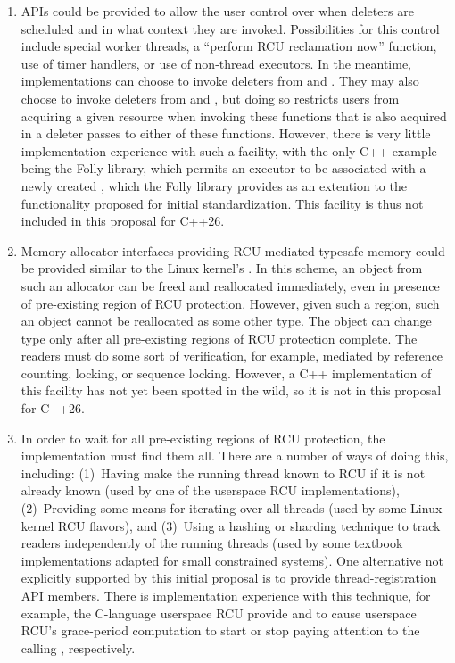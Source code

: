\begin{enumerate}
\item	APIs could be provided to allow the user control over when
	deleters are scheduled and in what context they are invoked.
	Possibilities for this control include special worker threads,
	a ``perform RCU reclamation now'' function, use of timer handlers,
	or use of non-thread executors.
	In the meantime, implementations can choose to invoke deleters
	from  and .
	They may also choose to invoke deleters from 
	and , but doing so restricts users from
	acquiring a given resource when invoking these functions that
	is also acquired in a deleter passes to either of these functions.
	However, there is very little implementation experience with
	such a facility, with the only C++ example being the Folly
	library, which permits an executor to be associated with a
	newly created , which the Folly library provides
	as an extention to the functionality proposed for initial
	standardization.
	This facility is thus not included in this proposal for C++26.
\item	Memory-allocator interfaces providing RCU-mediated typesafe
	memory could be provided similar to the Linux kernel's
	.
	In this scheme, an object from such an allocator can be freed
	and reallocated immediately, even in presence of pre-existing
	region of RCU protection.
	However, given such a region, such an object cannot be reallocated
	as some other type.
	The object can change type only after all pre-existing regions
	of RCU protection complete.
	The readers must do some sort of verification, for example,
	mediated by reference counting, locking, or sequence locking.
	However, a C++ implementation of this facility has not yet been
	spotted in the wild, so it is not in this proposal for C++26.
\item	In order to wait for all pre-existing regions of RCU protection,
	the implementation must find them all.
	There are a number of ways of doing this, including:
	(1)~Having  make the running thread known
	to RCU if it is not already known (used by one of the userspace
	RCU implementations),
	(2)~Providing some means for iterating over all threads (used
	by some Linux-kernel RCU flavors), and
	(3)~Using a hashing or sharding technique to track readers
	independently of the running threads (used by some textbook
	implementations adapted for small constrained systems).
	One alternative not explicitly supported by this initial
	proposal is to provide thread-registration API members.
	There is implementation experience with this technique,
	for example, the C-language userspace RCU provide
	 and 
	to cause userspace RCU's grace-period computation to start
	or stop paying attention to the calling ,
	respectively.


\end{enumerate}
